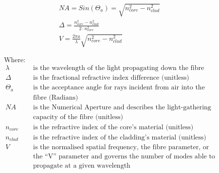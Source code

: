 \documentclass[colorlinks,11pt,a4paper,normalphoto,withhyper,ragged2e]{altareport}
\begin{document}
\begin{paracol}{2}
\medskip

\setlength{\jot}{4ex}
\begin{gather}
	NA = Sin(\Theta_a) = \sqrt{n_{core}^2 - n_{clad}^2} 
	\label{eqn:num_aper}\\
	\Delta = \frac{n_{core}^2 - n_{clad}^2}{2 \cdot n_{core}^2}
	\label{eqn:frac_ri_diff}\\
	V = \frac{2 \pi a}{\lambda}\sqrt{n_{core}^2 - n_{clad}^2} 
	\label{eqn:normalised}
\end{gather}

\switchcolumn

\setlength{\jot}{1ex}
\begin{align}
	\text{Where:}& \nonumber\\\
	\lambda & \text{ is the wavelength of the light propagating down the fibre} \nonumber\\\
	\Delta & \text{ is the fractional refractive index difference (unitless)} \nonumber\\\
	\Theta_a & \text{ is the acceptance angle for rays incident from air into the}\nonumber\\\
	& \text{ fibre (Radians)} \nonumber\\\
	NA & \text{ is the Numerical Aperture and describes the light-gathering} \nonumber\\\
	& \text{ capacity of the fibre (unitless)} \nonumber\\\
	n_{core} & \text{ is the refractive index of the core's material (unitless)} \nonumber\\\
	n_{clad} & \text{ is the refractive index of the cladding's material (unitless)} \nonumber\\\
	V & \text{ is the normalised spatial frequency, the fibre parameter, or} \nonumber\\\
	& \text{ the ``V'' parameter and governs the number of modes able to} \nonumber\\
	& \text{ propagate at a given wavelength} \nonumber
\end{align}
\end{paracol}
\end{document}
